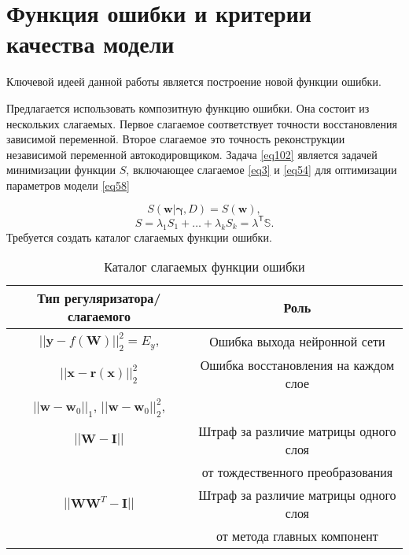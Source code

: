 \documentclass[12pt, twoside]{article}
\newcommand{\xb}{{\mathbf{x}}}
\newenvironment{comment}{}{}
\newcommand{\w}{{\mathbf{W}}}
\newcommand{\wm}{{\mathbf{w}}}
\begin{document}
\begin{comment}


\section{Функция ошибки и критерии качества модели}

Ключевой идеей данной работы является построение новой функции ошибки. 

Предлагается использовать композитную функцию ошибки. Она состоит из нескольких слагаемых. Первое слагаемое соответствует точности восстановления зависимой переменной. Второе слагаемое это точность реконструкции независимой переменной автокодировщиком. Задача \eqref{eq102} является задачей минимизации функции $S$, включающее слагаемое \eqref{eq3} и \eqref{eq54} для оптимизации параметров модели \eqref{eq58}

\begin{equation}
S(\wm|\mathbf{\gamma},D) = S(\wm),
\end{equation}
\begin{equation}\label{eq11}
S = \lambda_1S_1+\dots+\lambda_kS_k = \mathbb{\lambda}^{\mathsf{T}}\mathbb{S}.
\end{equation}
Требуется создать каталог слагаемых функции ошибки.
\begin{table}[h!]
\begin{center}
\begin{tabular}{|c|c|}
\hline
  Тип регуляризатора/слагаемого   & Роль  \\
  \hline
  $||\mathbf{y} - f(\w)||^2_2 = E_y$,   & Ошибка выхода нейронной сети \\
  \hline
  $||\xb-\mathbf{r}(\xb)||^2_2$ & Ошибка восстановления на каждом слое \\
  \hline
  $||\wm-\wm_0||_1$, $||\wm-\wm_0||^2_2$, & \\
  \hline
  $||\w-\mathbf{I}||$ & Штраф за различие матрицы одного слоя \\
  & от тождественного преобразования \\
  \hline
  $||\w\w^T-\mathbf{I}||$ & Штраф за различие матрицы одного слоя \\
  & от метода главных компонент \\
  \hline
\end{tabular}
\caption{Каталог слагаемых функции ошибки}
\end{center}
\end{table}



\end{comment}
\end{document}
